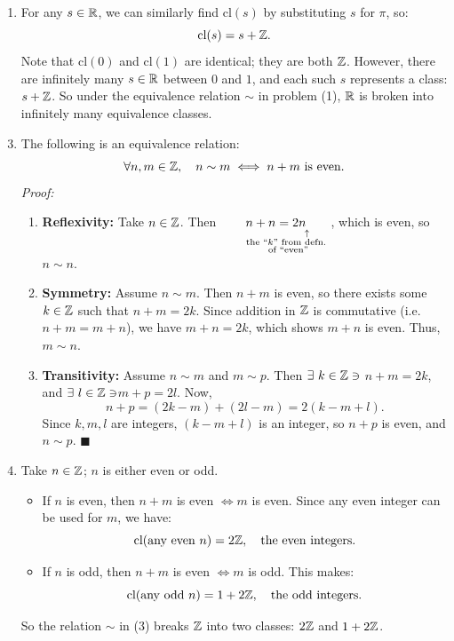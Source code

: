 \begin{enumerate}
\begin{enumerate}
              \item For any $s \in {\mathbb{ R}}$, we can similarly find $\text{cl}(s)$ by substituting $s$ for $\pi$, so:
                    \[
                    \text{cl}(s) = s + {\mathbb{ Z}}.
                    \]
                    Note that $\text{cl}(0)$ and $\text{cl}(1)$ are identical; they are both ${\mathbb{ Z}}$.  
                    However, there are infinitely many $s \in {\mathbb{ R}}$ between $0$ and $1$, and each such $s$ represents a class: $s + {\mathbb{ Z}}$.  
                    So under the equivalence relation $\sim$ in problem (1), ${\mathbb{ R}}$ is broken into infinitely many equivalence classes.
          \end{enumerate}
\end{enumerate}
\begin{enumerate}
    \setcounter{enumi}{2}
    \item The following is an equivalence relation:  
          \[
          \forall n,m \in {\mathbb{ Z}}, \quad n \sim m \iff n + m \text{ is even}.
          \]
          \textit{Proof:}  
          \begin{enumerate}
              \item \textbf{Reflexivity:} Take $n \in {\mathbb{ Z}}$. Then $\underset{\substack{\ \ \ \ \ \ \ \ \ \ \ \ \ \ \ \uparrow \\ \ \ \ \ \ \ \text{the }``k" \text{ from defn. } \\
              \ \ \ \ \ \ \text{of ``even''}}}{n + n = 2n}$, which is even, so $n \sim n$.
              \item \textbf{Symmetry:} Assume $n \sim m$. Then $n + m$ is even, so there exists some $k \in {\mathbb{ Z}}$ such that $n + m = 2k$.  
              Since addition in ${\mathbb{ Z}}$ is commutative (i.e. $n+m=m+n$), we have $m + n = 2k$, which shows $m + n$ is even. Thus, $m \sim n$.
              \item \textbf{Transitivity:} Assume $n \sim m$ and $m \sim p$.  
              Then $\exists \ k \in {\mathbb{ Z}} \ni $ $n + m = 2k$, and $\exists \ l \in {\mathbb{ Z}} \ni $$m + p = 2l$.  
              Now,
              \[
              n + p = (2k - m) + (2l - m) = 2(k - m + l).
              \]
              Since $k, m, l$ are integers, $(k-m+l)$ is an integer, so $n+p$ is even, and $n \sim p$. $\blacksquare$
          \end{enumerate}

    \item Take $n \in {\mathbb{ Z}}$; $n$ is either even or odd.  
          \begin{itemize}
              \item If $n$ is even, then $n + m$ is even $\iff m$ is even.  
              Since any even integer can be used for $m$, we have:
              \[
              \text{cl}(\text{any even } n) = 2{\mathbb{ Z}}, \quad \text{the even integers.}
              \]
              \item If $n$ is odd, then $n + m$ is even $\iff m$ is odd.  
              This makes:
              \[
              \text{cl}(\text{any odd } n) = 1 + 2{\mathbb{ Z}}, \quad \text{the odd integers.}
              \]
          \end{itemize}
          So the relation $\sim$ in (3) breaks ${\mathbb{ Z}}$ into two classes: $2{\mathbb{ Z}}$ and $1 + 2{\mathbb{ Z}}$.


\end{enumerate}
